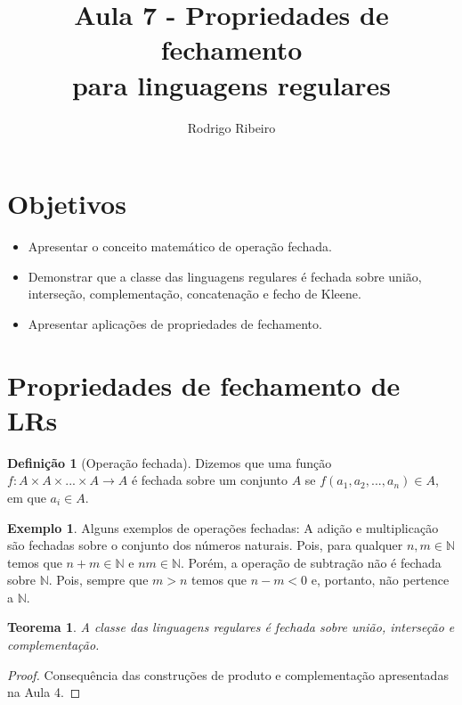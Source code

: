 \documentclass[a4paper]{article}
\newtheorem{Theorem}{Teorema}
\theoremstyle{definition}
\newtheorem{Example}{Exemplo}
\newtheorem{Definition}{Definição}
\begin{document}
  \title{Aula 7 - Propriedades de fechamento \\para linguagens regulares}
  \author{Rodrigo Ribeiro}

  \maketitle


  \pagestyle{fancy}


  \section*{Objetivos}

  \begin{itemize}
     \item Apresentar o conceito matemático de operação fechada.
     \item Demonstrar que a classe das linguagens regulares é
           fechada sobre união, interseção, complementação,
           concatenação e fecho de Kleene.
     \item Apresentar aplicações de propriedades de fechamento.
  \end{itemize}

  \section{Propriedades de fechamento de LRs}

  \begin{Definition}[Operação fechada]\label{fechada}
    Dizemos que uma função $f : A \times A \times ... \times A \to A$ é fechada
    sobre um conjunto $A$ se $f(a_1,a_2,...,a_n) \in A$, em que $a_i \in A$.
  \end{Definition}

  \begin{Example}
    Alguns exemplos de operações fechadas: A adição e multiplicação são fechadas
    sobre o conjunto dos números naturais. Pois, para qualquer $n,m
    \in\mathbb{N}$ temos que $n + m \in \mathbb{N}$ e $nm \in \mathbb{N}$.
    Porém, a operação de subtração não é fechada sobre $\mathbb{N}$. Pois,
    sempre que $m > n$ temos que $n - m < 0$ e, portanto, não pertence a $\mathbb{N}$.
  \end{Example}

  \begin{Theorem}
    A classe das linguagens regulares é fechada sobre união, interseção e
    complementação.
  \end{Theorem}
  \begin{proof}
    Consequência das construções de produto e complementação apresentadas na
    Aula 4.
  \end{proof}
\end{document}
